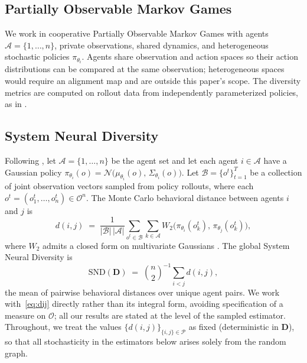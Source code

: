 \documentclass{article}
\theoremstyle{plain}
\theoremstyle{definition}
\theoremstyle{remark}
\newcommand{\Agents}{\mathcal{A}}        %
\newcommand{\Normal}{\mathcal{N}}        %
\newcommand{\Obs}{\mathcal{O}}           %
\newcommand{\Rollouts}{\mathcal{B}}      %
\newcommand{\Pairs}{\mathcal{P}}         %
\newcommand{\policy}[1]{\pi_{\theta_{#1}}}
\newcommand{\Wass}{W_2}
\newcommand{\SND}{\ensuremath{\mathrm{SND}}}
\begin{document}
\subsection{Partially Observable Markov Games}
\label{sec:background:pomg}

We work in cooperative Partially Observable Markov Games
\citep{kaelbling1998planning} with agents
$\Agents=\{1,\ldots,n\}$, private observations, shared dynamics, and
heterogeneous stochastic policies $\policy{i}$. Agents share observation
and action spaces so their action distributions can be compared at the
same observation; heterogeneous spaces would require an alignment map and
are outside this paper's scope. The diversity metrics are computed on
rollout data from independently parameterized policies, as in
\citet{bettini2023hetgppo,bettini2025snd}.

\subsection{System Neural Diversity}
Following \citet{bettini2025snd}, let $\Agents = \{1, \dots, n\}$ be the
agent set and let each agent $i \in \Agents$ have a Gaussian policy
$\policy{i}(o) = \Normal\bigl(\mu_{\theta_i}(o),\, \Sigma_{\theta_i}(o)\bigr)$.
Let $\Rollouts = \{o^t\}_{t=1}^T$ be a collection of joint observation
vectors sampled from policy rollouts, where each
$o^t = (o_1^t,\dots,o_n^t) \in \Obs^n$.
The Monte Carlo behavioral distance between agents $i$ and $j$ is
\begin{equation}
\label{eq:dij}
d(i,j) \;=\; \frac{1}{|\Rollouts|\,|\Agents|}
\sum_{o^t \in \Rollouts} \sum_{k \in \Agents}
\Wass\bigl(\policy{i}(o^t_k),\, \policy{j}(o^t_k)\bigr),
\end{equation}
where $\Wass$ admits a closed form on multivariate Gaussians
\citep{bettini2025snd}. The global System Neural Diversity is
\begin{equation}
\label{eq:snd}
\SND(\mathbf{D}) \;=\; \binom{n}{2}^{-1} \sum_{i<j} d(i,j),
\end{equation}
the mean of pairwise behavioral distances over unique agent pairs. We work
with~\eqref{eq:dij} directly rather than its integral form, avoiding
specification of a measure on $\Obs$; all our results are stated at the
level of the sampled estimator. Throughout, we treat the values
$\{d(i,j)\}_{\{i,j\} \in \Pairs}$ as fixed (deterministic in $\mathbf{D}$),
so that all stochasticity in the estimators below arises solely from the
random graph.

\end{document}

